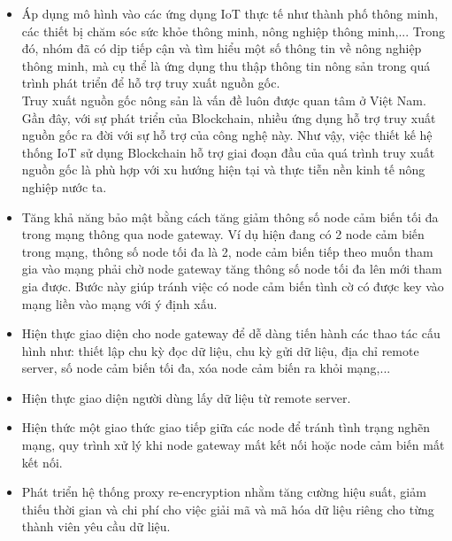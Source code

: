 \begin{itemize}
    \item Áp dụng mô hình vào các ứng dụng IoT thực tế như thành phố thông minh, các thiết bị chăm sóc sức khỏe thông minh, nông nghiệp thông minh,... Trong đó, nhóm  đã có dịp tiếp cận và tìm hiểu một số thông tin về nông nghiệp thông minh, mà cụ thể là ứng dụng thu thập thông tin nông sản trong quá trình phát triển để hỗ trợ truy xuất nguồn gốc.\\
    Truy xuất nguồn gốc nông sản là vấn đề luôn được quan tâm ở Việt Nam. Gần đây, với sự phát triển của Blockchain, nhiều ứng dụng hỗ trợ truy xuất nguồn gốc ra đời với sự hỗ trợ của công nghệ này. Như vậy, việc thiết kế hệ thống IoT sử dụng Blockchain hỗ trợ giai đoạn đầu của quá trình truy xuất nguồn gốc là phù hợp với xu hướng hiện tại và thực tiễn nền kinh tế nông nghiệp nước ta.
    \item Tăng khả năng bảo mật bằng cách tăng giảm thông số node cảm biến tối đa trong mạng thông qua node gateway. Ví dụ hiện đang có 2 node cảm biến trong mạng, thông số node tối đa là 2, node cảm biến tiếp theo muốn tham gia vào mạng phải chờ node gateway tăng thông số node tối đa lên mới tham gia được. Bước này giúp tránh việc có node cảm biến tình cờ có được key vào mạng liền vào mạng với ý định xấu.
    \item Hiện thực giao diện cho node gateway để dễ dàng tiến hành các thao tác cấu hình như: thiết lập chu kỳ đọc dữ liệu, chu kỳ gửi dữ liệu, địa chỉ remote server, số node cảm biến tối đa, xóa node cảm biến ra khỏi mạng,...
    \item Hiện thực giao diện người dùng lấy dữ liệu từ remote server.
    \item Hiện thức một giao thức giao tiếp giữa các node để tránh tình trạng nghẽn mạng, quy trình xử lý khi node gateway mất kết nối hoặc node cảm biến mất kết nối.
    \item Phát triển hệ thống proxy re-encryption nhằm tăng cường hiệu suất, giảm thiếu thời gian và chi phí cho việc giải mã và mã hóa dữ liệu riêng cho từng thành viên yêu cầu dữ liệu.
\end{itemize}
   
